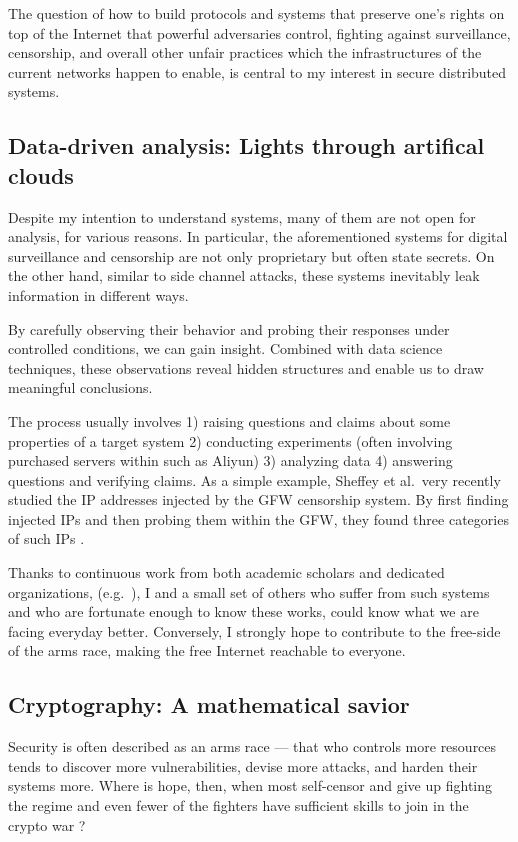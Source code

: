 \documentclass[10pt]{article}
\begin{document}
The question of how to build protocols and systems that preserve one's rights
on top of the Internet that powerful adversaries control, fighting against
surveillance, censorship, and overall other unfair practices which the
infrastructures of the current networks happen to enable, is central to my
interest in secure distributed systems.


\subsection[Data-driven analysis]{
Data-driven analysis: Lights through artifical clouds}
Despite my intention to understand systems, many of them are not open for
analysis, for various reasons. In particular, the aforementioned systems for
digital surveillance and censorship are not only proprietary but often state
secrets. On the other hand, similar to side channel attacks, these systems
inevitably leak information in different ways.

By carefully observing their behavior and probing their responses under
controlled conditions, we can gain insight. Combined with data science
techniques, these observations reveal hidden structures and enable us to draw
meaningful conclusions.

The process usually involves 1) raising questions and claims about some
properties of a target system 2) conducting experiments (often involving
purchased servers within such as Aliyun) 3) analyzing data 4) answering
questions and verifying claims. As a simple example, Sheffey et al.\ very
recently studied the IP addresses injected by the GFW censorship system. By
first finding injected IPs and then probing them within the GFW, they found
three categories of such IPs \cite{gfw.injected.ip}. 

Thanks to continuous work from both academic scholars and dedicated
organizations, (e.g.\ \cite{data.analysis.1, data.analysis.2, censor.block.6}),
I and a small set of others who suffer from such systems and who are fortunate
enough to know these works, could know what we are facing everyday better.
Conversely, I strongly hope to contribute to the free-side of the arms race,
making the free Internet reachable to everyone.

\subsection[Cryptography]{Cryptography: A mathematical savior}
\label{sec.crypto}
Security is often described as an arms race --- that who controls more
resources tends to discover more vulnerabilities, devise more attacks, and
harden their systems more. Where is hope, then, when most self-censor and give
up fighting the regime \cite{self.censor.1, self.censor.2, self.censor.3}  and
even fewer of the fighters have sufficient skills to join in the crypto war
\cite{defenders.lack.skills.1, defenders.lack.skills.2}?
\end{document}
